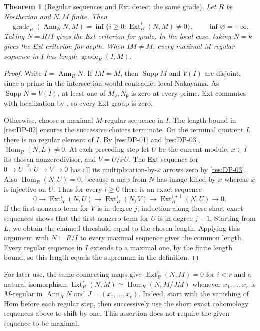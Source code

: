 \documentclass[11pt,oneside,openany]{book}
\newtheorem{theorem}{Theorem}[chapter]
\theoremstyle{definition}
\theoremstyle{remark}
\begin{document}
\begin{theorem}[Regular sequences and Ext detect the same grade]
\label{res:DP-04}
Let $R$ be Noetherian and $N,M$ finite. Then
\[
 \operatorname{grade}_R(\operatorname{Ann}_RN,M)
   =\inf\{i\ge0:\operatorname{Ext}^i_R(N,M)\ne0\},
 \qquad \inf\varnothing=+\infty.
\]
Taking $N=R/I$ gives the Ext criterion for grade. In the local case,
taking $N=k$ gives the Ext criterion for depth. When $IM\ne M$,
every maximal $M$-regular sequence in $I$ has length
$\operatorname{grade}_R(I,M)$.
\end{theorem}
\begin{proof}
Write $I=\operatorname{Ann}_R N$. If $IM=M$, then
$\operatorname{Supp}M$ and $V(I)$ are disjoint, since a prime in the
intersection would contradict local Nakayama. As $\operatorname{Supp}N=V(I)$,
at least one of $M_{\mathfrak p},N_{\mathfrak p}$ is zero at every prime.
Ext commutes with localization by
\cite[Theorem ALG-10-C03-S03]{p103}, so every Ext group is zero.

Otherwise, choose a maximal $M$-regular sequence in $I$. The length
bound in \ref{res:DP-02} ensures the successive choices terminate.
On the terminal quotient $L$ there is no regular element of $I$.
By \ref{res:DP-01} and \ref{res:DP-03},
$\operatorname{Hom}_R(N,L)\ne0$. At each preceding step let $U$ be
the current module, $x\in I$ its chosen nonzerodivisor, and $V=U/xU$.
The Ext sequence for $0\to U\xrightarrow{x}U\to V\to0$
has all its multiplication-by-$x$ arrows zero by \ref{res:DP-03}.
Also $\operatorname{Hom}_R(N,U)=0$, because a map from $N$ has image
killed by $x$ whereas $x$ is injective on $U$. Thus for every $i\ge0$
there is an exact sequence
\[
 0\longrightarrow \operatorname{Ext}_R^i(N,U)
 \longrightarrow \operatorname{Ext}_R^i(N,V)
 \longrightarrow \operatorname{Ext}_R^{i+1}(N,U)
 \longrightarrow0 .
\]
If the first nonzero term for $V$ is in degree $j$, induction along
these short exact sequences shows that the first nonzero term
for $U$ is in degree $j+1$. Starting from $L$, we obtain the claimed
threshold equal to the chosen length. Applying this argument with
$N=R/I$ to every maximal sequence gives the common length. Every
regular sequence in $I$ extends to a maximal one, by the finite
length bound, so this length equals the supremum in the definition.
\end{proof}

For later use, the same connecting maps give
$\operatorname{Ext}_R^i(N,M)=0$ for $i<r$ and a natural isomorphism
$\operatorname{Ext}_R^r(N,M)\simeq\operatorname{Hom}_R(N,M/JM)$
whenever $x_1,\ldots,x_r$ is $M$-regular in $\operatorname{Ann}_R N$
and $J=(x_1,\ldots,x_r)$. Indeed, start with the vanishing of Hom
before each regular step, then successively use the short exact
cohomology sequences above to shift by one. This assertion does
not require the given sequence to be maximal.
\end{document}
